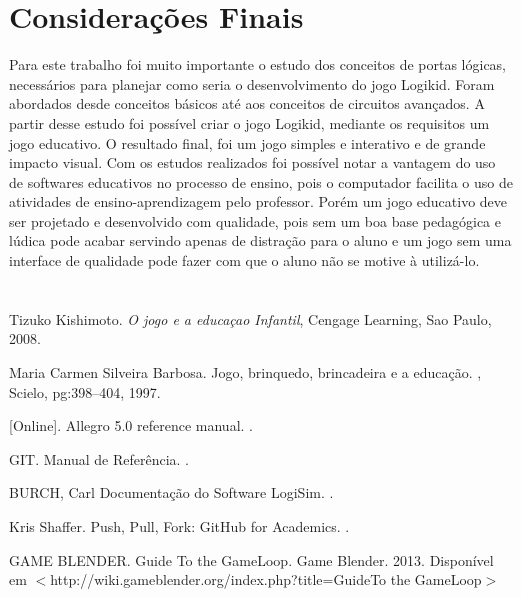 \documentclass[12pt]{article}
\begin{document}
\section{Considerações Finais}

Para este trabalho foi muito importante o estudo dos conceitos de portas lógicas, necessários para
planejar como seria o desenvolvimento do jogo Logikid. Foram abordados desde conceitos
básicos até aos conceitos de circuitos avançados. A partir desse
estudo foi possível criar o jogo Logikid, mediante os requisitos um jogo educativo.
O resultado final, foi um jogo simples e interativo  e de grande impacto visual.
Com os estudos realizados foi possível notar a vantagem do uso de softwares
educativos no processo de ensino, pois o computador facilita o uso de atividades de ensino-aprendizagem
pelo professor. Porém um jogo educativo deve ser projetado e desenvolvido com qualidade, pois sem um boa base pedagógica e lúdica pode acabar servindo apenas de distração para o
aluno e um jogo sem uma interface de qualidade pode fazer com que o aluno não
se motive à utilizá-lo.
\section*{}

\begin{thebibliography}{1}

Tizuko Kishimoto.
  {\em O jogo e a educaçao Infantil}, 
  Cengage Learning, Sao Paulo, 2008.

Maria Carmen Silveira Barbosa.
\newblock Jogo, brinquedo, brincadeira e a educação.
, Scielo, pg:398--404, 1997.

[Online].
\newblock Allegro 5.0 reference manual.
.

GIT.
\newblock Manual de Referência.
.

BURCH, Carl
\newblock Documentação do Software LogiSim.
.

Kris Shaffer.
\newblock Push, Pull, Fork: GitHub for Academics.
.

GAME BLENDER. Guide To the GameLoop. Game Blender. 2013.
\newblock Disponível em $<$http://wiki.gameblender.org/index.php?title=Guide\textunderscore To \textunderscore the \textunderscore GameLoop$>$

\end{thebibliography}
\end{document}
